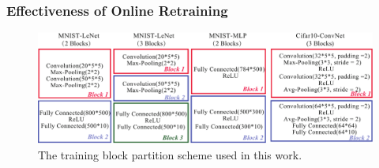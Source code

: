 \subsubsection{Effectiveness of Online Retraining}

\begin{figure}
    \centering
    \includegraphics[width=0.85\linewidth]{images/OL-fig16}
    \caption{ The training block partition scheme used in this work. }
    \label{fig:blockpartition}
    \vspace{-15pt}
\end{figure} 

